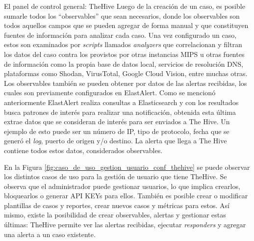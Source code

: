 \begin{section}{El panel de control general: TheHive }
     Luego de la creación de un caso, es posible sumarle todos los “observables” que sean necesarios, donde los observables son todos aquellos campos que se pueden agregar de forma manual y que constituyen fuentes de información para analizar cada caso. Una vez configurado un caso, estos son examinados por \textit{scripts} llamados \textit{analyzers} que correlacionan y filtran los datos del caso contra los provistos por otras instancias MIPS u otras fuentes de información como la propia base de datos local, servicios de resolución DNS, plataformas como Shodan\cite{shodan}, VirusTotal\cite{virustotal}, Google Cloud Vision\cite{vision-AI}, entre muchas otras. Los observables también se pueden obtener por datos de las alertas recibidas, los cuales son previamente configurados en ElastAlert. Como se mencionó anteriormente ElastAlert realiza consultas a Elasticsearch y con los resultados busca patrones de interés para realizar una notificación, obtenida esta última extrae datos que se consideran de interés para ser enviados a The Hive. Un ejemplo de esto puede ser un número de IP, tipo de protocolo, fecha que se generó el \textit{log}, puerto de origen y/o destino. La alerta que llega a The Hive contiene todos estos datos, considerados observables. \par
     En la Figura \ref{fig:caso_de_uso_gestion_usuario_conf_thehive} se puede observar los distintos casos de uso para la gestión de usuario que tiene TheHive. Se observa que el administrador puede gestionar usuarios, lo que implica crearlos, bloquearlos o generar API KEYs para ellos. También es posible crear o modificar plantillas de casos y reportes, crear nuevos casos y métricas para estos. Así mismo, existe la posibilidad de  crear observables, alertas y gestionar estas últimas: TheHive permite ver las alertas recibidas, ejecutar \textit{responders} y agregar una alerta a un caso existente.\par


\end{section}
